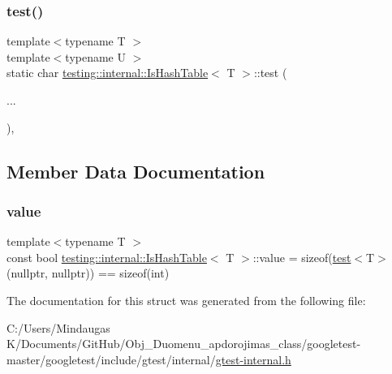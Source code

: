 \mbox{\label{structtesting_1_1internal_1_1_is_hash_table_a40461295b959ff31e06241d4de072be0}} 
\subsubsection{\texorpdfstring{test()}{test()}\hspace{0.1cm}{\footnotesize\ttfamily [9/9]}}
{\footnotesize\ttfamily template$<$typename T $>$ \\
template$<$typename U $>$ \\
static char \mbox{\hyperlink{structtesting_1_1internal_1_1_is_hash_table}{testing\+::internal\+::\+Is\+Hash\+Table}}$<$ T $>$\+::test (\begin{DoxyParamCaption}\item[{}]{... }\end{DoxyParamCaption})\hspace{0.3cm}{\ttfamily [static]}, {\ttfamily [private]}}



\subsection{Member Data Documentation}
\mbox{\label{structtesting_1_1internal_1_1_is_hash_table_a165e0a3eddfa5fadf9b950be6432d848}} 
\subsubsection{\texorpdfstring{value}{value}}
{\footnotesize\ttfamily template$<$typename T $>$ \\
const bool \mbox{\hyperlink{structtesting_1_1internal_1_1_is_hash_table}{testing\+::internal\+::\+Is\+Hash\+Table}}$<$ T $>$\+::value = sizeof(\mbox{\hyperlink{structtesting_1_1internal_1_1_is_hash_table_acc4d1e2307a1e0527932da7a7d354f06}{test}}$<$T$>$(nullptr, nullptr)) == sizeof(int)\hspace{0.3cm}{\ttfamily [static]}}



The documentation for this struct was generated from the following file\+:\begin{DoxyCompactItemize}
\item 
C\+:/\+Users/\+Mindaugas K/\+Documents/\+Git\+Hub/\+Obj\+\_\+\+Duomenu\+\_\+apdorojimas\+\_\+class/googletest-\/master/googletest/include/gtest/internal/\mbox{\hyperlink{googletest-master_2googletest_2include_2gtest_2internal_2gtest-internal_8h}{gtest-\/internal.\+h}}\end{DoxyCompactItemize}

